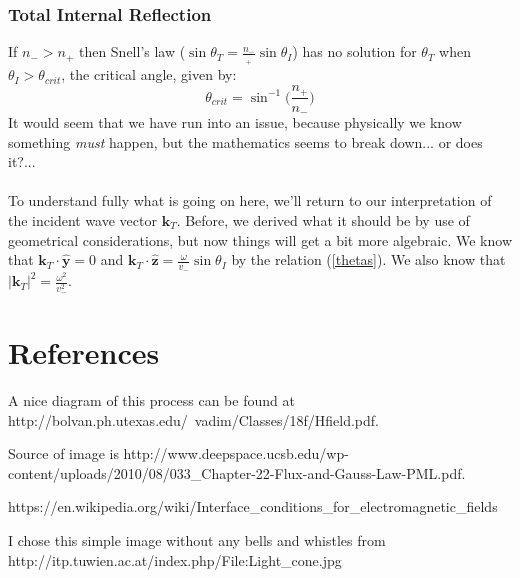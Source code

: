 \documentclass[a4paper]{article}
\numberwithin{equation}{section}
\begin{document}
\subsubsection{Total Internal Reflection}
If $n_->n_+$ then Snell's law ($\sin \theta_T = \frac{n_-}{_+}\sin \theta_I$) has no solution for $\theta_T$ when $\theta_I > \theta_{crit}$, the critical angle, given by:
\begin{equation}
\theta_{crit} = \sin^{-1} \bigg( \frac{n_+}{n_-} \bigg)
\end{equation}
It would seem that we have run into an issue, because physically we know something \textit{must} happen, but the mathematics seems to break down... or does it?...\\
\\
To understand fully what is going on here, we'll return to our interpretation of the incident wave vector $\mathbf{k}_T$. Before, we derived what it should be by use of geometrical considerations, but now things will get a bit more algebraic. We know that $\mathbf{k}_T \cdot \hat{\mathbf{y}} = 0$ and $\mathbf{k}_T \cdot \hat{\mathbf{z}} = \frac{\omega}{v_-}\sin \theta_I$ by the relation (\ref{thetas}). We also know that $|\mathbf{k}_T|^2 = \frac{\omega^2}{v_-^2}$.

\section{References}
\begin{enumerate}[{[}1{]}]
	\item \label{ref1} A nice diagram of this process can be found at http://bolvan.ph.utexas.edu/~vadim/Classes/18f/Hfield.pdf. 
	\item \label{ref2} Source of image is http://www.deepspace.ucsb.edu/wp-content/uploads/2010/08/033\_Chapter-22-Flux-and-Gauss-Law-PML.pdf.
	\item \label{matching conditions} https://en.wikipedia.org/wiki/Interface\_conditions\_for\_electromagnetic\_fields
	\item \label{lightcone} I chose this simple image without any bells and whistles from http://itp.tuwien.ac.at/index.php/File:Light\_cone.jpg
\end{enumerate}
\end{document}
